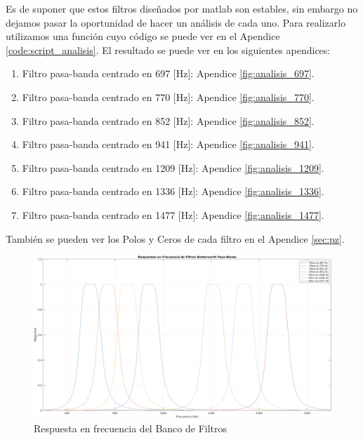 Es de suponer que estos filtros diseñados por matlab son estables, sin embargo no dejamos pasar la oportunidad de hacer un análisis de cada uno. Para realizarlo utilizamos una función cuyo código se puede ver en el Apendice \ref{code:script_analisis}. El resultado se puede ver en los siguientes apendices:

\begin{enumerate}
  \item Filtro pasa-banda centrado en 697 [Hz]: Apendice \ref{fig:analisis_697}.
  \item Filtro pasa-banda centrado en 770 [Hz]: Apendice \ref{fig:analisis_770}.
  \item Filtro pasa-banda centrado en 852 [Hz]: Apendice \ref{fig:analisis_852}.
  \item Filtro pasa-banda centrado en 941 [Hz]: Apendice \ref{fig:analisis_941}.
  \item Filtro pasa-banda centrado en 1209 [Hz]: Apendice \ref{fig:analisis_1209}.
  \item Filtro pasa-banda centrado en 1336 [Hz]: Apendice \ref{fig:analisis_1336}.
  \item Filtro pasa-banda centrado en 1477 [Hz]: Apendice \ref{fig:analisis_1477}.
\end{enumerate}

También se pueden ver los Polos y Ceros de cada filtro en el Apendice \ref{sec:pz}.

\begin{figure}[H]
  
\end{figure}

\begin{figure}[!htb]
  \centering
  \includegraphics[width=\linewidth]{images/desarrollo/freq_filtros.png}
  \caption{Respuesta en frecuencia del Banco de Filtros}
  \label{fig:banco_filtros_resp_frec}
\end{figure}

